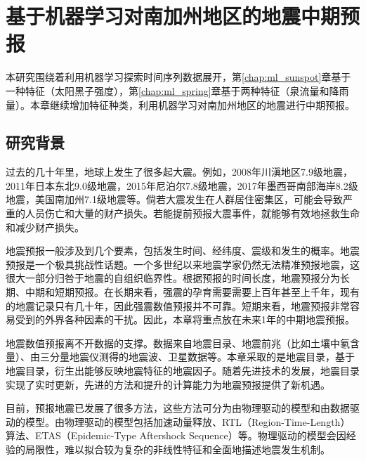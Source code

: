 \chapter{基于机器学习对南加州地区的地震中期预报}\label{chap:ml_seismic}

本研究围绕着利用机器学习探索时间序列数据展开，第\ref{chap:ml_sunspot}章基于一种特征（太阳黑子强度），第\ref{chap:ml_spring}章基于两种特征（泉流量和降雨量）。本章继续增加特征种类，利用机器学习对南加州地区的地震进行中期预报。

\section{研究背景}\label{sec:seism_introduction}

过去的几十年里，地球上发生了很多起大震。例如，2008年川滇地区7.9级地震，2011年日本东北9.0级地震，2015年尼泊尔7.8级地震，2017年墨西哥南部海岸8.2级地震，美国南加州7.1级地震等。倘若大震发生在人群居住密集区，可能会导致严重的人员伤亡和大量的财产损失。若能提前预报大震事件，就能够有效地拯救生命和减少财产损失。

地震预报一般涉及到几个要素，包括发生时间、经纬度、震级和发生的概率\citep{allen1976responsibilities}。地震预报是一个极具挑战性话题\citep{geller1997earthquakes}。一个多世纪以来地震学家仍然无法精准预报地震，这很大一部分归咎于地震的自组织临界性。根据预报的时间长度，地震预报分为长期、中期和短期预报\citep{Pulinets2018What}。在长期来看，强震的孕育需要需要上百年甚至上千年，现有的地震记录只有几十年，因此强震数值预报并不可靠。短期来看，地震预报非常容易受到的外界各种因素的干扰。因此，本章将重点放在未来1年的中期地震预报。

地震数值预报离不开数据的支撑。数据来自地震目录、地震前兆（比如土壤中氡含量）、由三分量地震仪测得的地震波、卫星数据等\citep{al2020application}。本章采取的是地震目录，基于地震目录，衍生出能够反映地震特征的地震因子。随着先进技术的发展，地震目录实现了实时更新，先进的方法和提升的计算能力为地震预报提供了新机遇。

目前，预报地震已发展了很多方法，这些方法可分为由物理驱动的模型和由数据驱动的模型。由物理驱动的模型包括加速动量释放\citep{Ben2002Accelerated}、RTL（Region-Time-Length）算法\citep{Sobolev2007On}、ETAS（Epidemic-Type Aftershock Sequence）\citep{Ogata1986Statistical}等。物理驱动的模型会因经验的局限性，难以拟合较为复杂的非线性特征和全面地描述地震发生机制。

